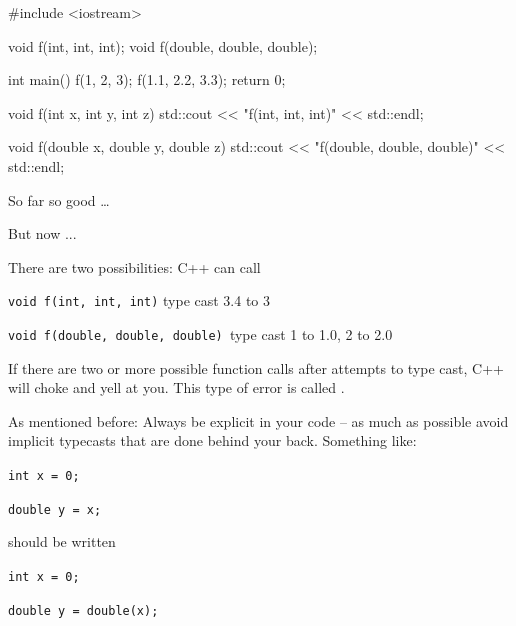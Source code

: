 \begin{consolethree}[escapeinside=||]
#include <iostream>

void f(int, int, int);
void f(double, double, double);

int main()
{
    f(1, 2, 3);
    f(1.1, 2.2, 3.3);
    return 0;
}

void f(int x, int y, int z)
{
    std::cout << "f(int, int, int)" << std::endl;
}

void f(double x, double y, double z)
{
    std::cout << "f(double, double, double)"
              << std::endl;
}
\end{consolethree}

So far so good \ldots{}

But now ...


There are two possibilities: C++ can call

\texttt{void f(int, int, int)} type cast 3.4 to 3

\texttt{void f(double, double, double) }type cast 1 to 1.0, 2 to 2.0

If there are two or more possible function calls after attempts to type cast, C++ will choke and yell at you. This type of error is called .

As mentioned before: Always be explicit in your code -- as much as possible avoid implicit typecasts that are done behind your back. Something like:

\verb!int x = 0;!

\verb!double y = x;!

should be written

\verb!int x = 0;!

\verb!double y = double(x);!

